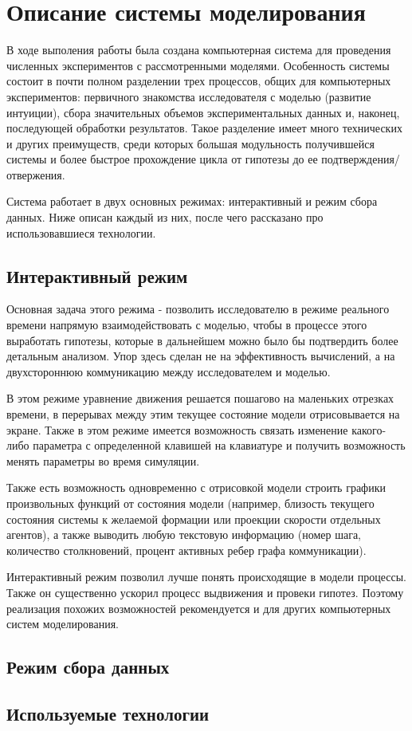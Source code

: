 \chapter{Описание системы моделирования} \label{simulation}

В ходе выполения работы была создана компьютерная система для проведения численных экспериментов с рассмотренными моделями. Особенность системы состоит в почти полном разделении трех процессов, общих для компьютерных экспериментов: первичного знакомства исследователя с моделью (развитие интуиции), сбора значительных объемов экспериментальных данных и, наконец, последующей обработки результатов.
Такое разделение имеет много технических и других преимуществ, среди которых большая модульность получившейся системы и более быстрое прохождение цикла от гипотезы до ее подтверждения/отвержения.

Система работает в двух основных режимах: интерактивный и режим сбора данных. Ниже описан каждый из них, после чего рассказано про использовавшиеся технологии.

\section{Интерактивный режим}
Основная задача этого режима - позволить исследователю в режиме реального времени напрямую взаимодействовать с моделью, чтобы в процессе этого выработать гипотезы, которые в дальнейшем можно было бы подтвердить более детальным анализом. Упор здесь сделан не на эффективность вычислений, а на двухстороннюю коммуникацию между исследователем и моделью.

В этом режиме уравнение движения решается пошагово на маленьких отрезках времени, в перерывах между этим текущее состояние модели отрисовывается на экране. Также в этом режиме имеется возможность связать изменение какого-либо параметра с определенной клавишей на клавиатуре и получить возможность менять параметры во время симуляции.

Также есть возможность одновременно с отрисовкой модели строить графики произвольных функций от состояния модели (например, близость текущего состояния системы к желаемой формации или проекции скорости отдельных агентов), а также выводить любую текстовую информацию (номер шага, количество столкновений, процент активных ребер графа коммуникации).

Интерактивный режим позволил лучше понять происходящие в модели процессы. Также он существенно ускорил процесс выдвижения и провеки гипотез. Поэтому реализация похожих возможностей рекомендуется и для других компьютерных систем моделирования.

\section{Режим сбора данных}


\section{Используемые технологии}



\clearpage
